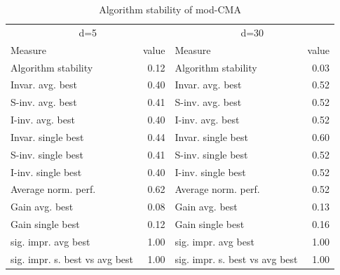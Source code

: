 \begin{table}
\caption{Algorithm stability of mod-CMA}
\begin{tabular}{lrlr}
\toprule
\multicolumn{2}{c}{d=5} & \multicolumn{2}{c}{d=30} \\
Measure & value & Measure & value \\
\midrule
Algorithm stability & 0.12 & Algorithm stability & 0.03 \\
Invar. avg. best & 0.40 & Invar. avg. best & 0.52 \\
S-inv. avg. best & 0.41 & S-inv. avg. best & 0.52 \\
I-inv. avg. best & 0.40 & I-inv. avg. best & 0.52 \\
Invar. single best & 0.44 & Invar. single best & 0.60 \\
S-inv. single best & 0.41 & S-inv. single best & 0.52 \\
I-inv. single best & 0.40 & I-inv. single best & 0.52 \\
Average norm. perf. & 0.62 & Average norm. perf. & 0.52 \\
Gain avg. best & 0.08 & Gain avg. best & 0.13 \\
Gain single best & 0.12 & Gain single best & 0.16 \\
sig. impr. avg best & 1.00 & sig. impr. avg best & 1.00 \\
sig. impr. s. best vs avg best & 1.00 & sig. impr. s. best vs avg best & 1.00 \\
\bottomrule
\end{tabular}
\end{table}

